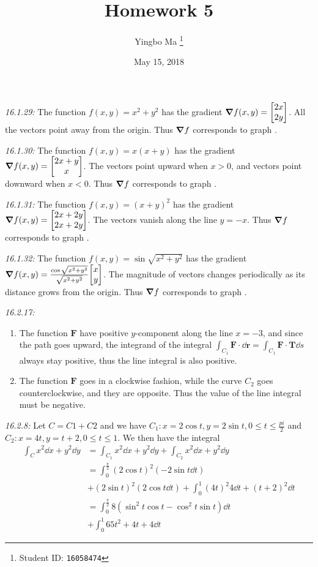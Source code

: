 \documentclass[8pt,twocolumn]{article}
\author{Yingbo Ma \thanks{Student ID: \tt{16058474}}}
\title{\vspace{-1.cm}Homework 5}
\date{May 15, 2018}
\begin{document}
\maketitle

\begin{Answer}[number=29]
  \emph{16.1.29:}
  The function $f(x,y) = x^2 + y^2$ has the gradient $\grad f(x,y) =
  \mqty[2x\\2y]$. All the vectors point away from the origin.
  Thus $\grad f$ corresponds to graph .

  \emph{16.1.30:}
  The function $f(x,y) = x(x+y)$ has the gradient $\grad f(x,y) =
  \mqty[2x+y\\x]$. The vectors point upward when $x>0$, and vectors point
  downward when $x<0$.
  Thus $\grad f$ corresponds to graph .

  \emph{16.1.31:}
  The function $f(x,y) = (x+y)^2$ has the gradient $\grad f(x,y) =
  \mqty[2x+2y\\2x+2y]$. The vectors vanish along the line $y=-x$.
  Thus $\grad f$ corresponds to graph .

  \emph{16.1.32:}
  The function $f(x,y) = \sin \sqrt{x^2+y^2}$ has the gradient $\grad f(x,y) =
  \frac{\cos\sqrt{x^2+y^2}}{\sqrt{x^2+y^2}}\mqty[x\\y]$. The magnitude of
  vectors changes periodically as its distance grows from the origin.
  Thus $\grad f$ corresponds to graph .

  \emph{16.2.17:}
  \begin{enumerate}
    \item
      The function $\bm{F}$ have positive $y$-component along the line $x=-3$, and
      since the path goes upward, the integrand of the integral
      $\int_{C_1}\bm{F}\cdot \dd{\bm{r}} = \int_{C_1}\bm{F}\cdot\bm{T} \dd{s}$ always
      stay positive, thus the line integral is also positive.
    \item
      The function $\bm{F}$ goes in a clockwise fashion, while the curve $C_2$
      goes counterclockwise, and they are opposite. Thus the value of the line
      integral must be negative.
  \end{enumerate}

  \emph{16.2.8:}
  Let $C = C1 + C2$ and we have $C_1: x=2\cos t, y=2\sin t, 0\le t \le
  \frac{pi}{2}$ and $C_2: x=4t, y=t+2, 0\le t\le 1$. We then have the integral
  \begin{align*}
    \int_C x^2\dd{x}+y^2\dd{y} &= \int_{C_1} x^2\dd{x}+y^2\dd{y} + \int_{C_2}
    x^2\dd{x}+y^2\dd{y} \\
    &= \int_0^{\frac{\pi}{2}}(2\cos t)^2 (-2\sin t\dd{t}) \\
    &+ (2\sin t)^2 (2\cos t\dd{t}) + \int_0^1 (4t)^2 4\dd{t} + (t+2)^2 \dd{t}
    \\
    &= \int_0^{\frac{\pi}{2}}8 (\sin^2 t \cos t - \cos^2 t\sin t)\dd{t} \\
    &+\int_0^1 65t^2+4t+4 \dd{t}
  \end{align*}
\end{Answer}
\end{document}

